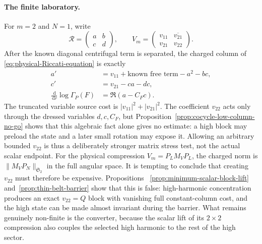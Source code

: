 \documentclass[11pt]{article}
\newcommand{\HS}{\mathfrak S_2}
\newcommand{\dd}{\,\mathrm d}
\theoremstyle{definition}
\theoremstyle{remark}
\begin{document}
\paragraph{The finite laboratory.}
For $m=2$ and $N=1$, write
\begin{equation}
 \mathcal R=\begin{pmatrix}a&b\\c&d\end{pmatrix},
 \qquad
 V_m=\begin{pmatrix}v_{11}&\overline{v_{21}}\\v_{21}&v_{22}\end{pmatrix}.
\end{equation}
After the known diagonal centrifugal term is separated, the charged column of
\eqref{eq:physical-Riccati-equation} is exactly
\begin{align}
 a'&=v_{11}+\text{known free term}-a^2-bc,
 \label{eq:finite-Riccati-a}\\
 c'&=v_{21}-ca-dc,
 \label{eq:finite-Riccati-c}\\
 \frac{\dd}{\dd r}\log\Gamma_P(F)
 &=\Re(a-C_Fc).
 \label{eq:finite-Riccati-flux}
\end{align}
The truncated variable source cost is $|v_{11}|^2+|v_{21}|^2$.
The coefficient $v_{22}$ acts only through the dressed variables $d,c,C_F$,
but Proposition~\ref{prop:cocycle-low-column-no-go} shows that this algebraic
fact alone gives no estimate: a high block may preload the state and a later
small rotation may expose it.  Allowing an arbitrary bounded $v_{22}$ is thus
a deliberately stronger matrix stress test, not the actual scalar endpoint.
For the physical compression $V_m=P_LM_VP_L$, the charged norm is
$\|M_VP_N\|_{\HS}$ in the full angular space.  It is tempting to conclude that
creating $v_{22}$ must therefore be expensive.  Propositions
~\ref{prop:minimum-scalar-block-lift} and~\ref{prop:thin-belt-barrier} show that
this is false: high-harmonic concentration produces an exact $v_{22}=Q$ block
with vanishing full constant-column cost, and the high state can be made almost
invariant during the barrier.  What remains genuinely non-finite is the
converter, because the scalar lift of its $2\times2$ compression also couples
the selected high harmonic to the rest of the high sector.
\end{document}
